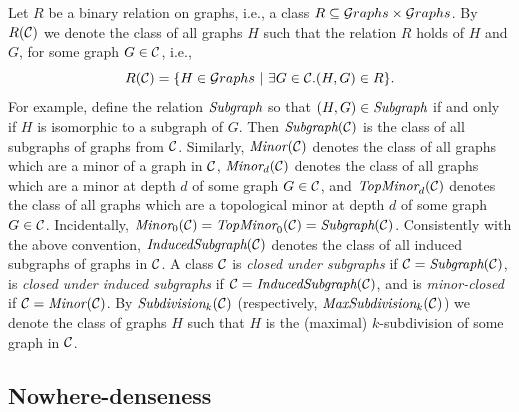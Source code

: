 Let $R$ be a binary relation on graphs, i.e., a class $R\subseteq {\mathcal G}\!\,raphs\times {\mathcal G}\!\,raphs$.
By $R({\cal C})$ we denote the class of all graphs $H$
such that the relation $R$ holds of $H$ and $G$, for some graph $G\in {\cal C}$, i.e.,
$$R({\cal C})=\{H\in {\mathcal G}\!\,raphs\ |\ \exists G\in {\cal C}. (H,G)\in R\}.$$
For example, define the relation $\textit{Subgraph}$
so that $(H,G)\in\textit{Subgraph}$ if and only if $H$
is isomorphic to a subgraph of $G$. Then $\textit{Subgraph}({\cal C})$
is the class of all subgraphs of graphs from ${\cal C}$.
Similarly, $\textit{Minor}_{}({\cal C})$ denotes the class of all graphs which are a minor of a graph in ${\cal C}$,
$\textit{Minor}_{d} ({\cal C})$ denotes the class of all graphs which are a minor at depth $d$ of some graph $G\in{\cal C}$,
and $\textit{TopMinor}_{d} ({\cal C})$ denotes the class of all graphs which 
are a topological minor at depth $d$ of some graph $G\in 
{\cal C}$. Incidentally, $\textit{Minor}_{0} ({\cal C})=\textit{TopMinor}_{0} 
({\cal C})=\textit{Subgraph}({\cal C})$. Consistently with the above 
convention, $\textit{InducedSubgraph}({\cal C})$ denotes the class of all induced 
subgraphs of graphs in ${\cal C}$.
A class ${\cal C}$ is \emph{closed under subgraphs} if ${\cal C}=\textit{Subgraph}({\cal C})$, is \emph{closed under induced subgraphs} if ${\cal C}=\textit{InducedSubgraph}({\cal C})$, and is \emph{minor-closed}
if ${\cal C}=\textit{Minor}_{}({\cal C})$.
By  $\textit{Subdivision}_{k}({\cal C})$ (respectively, $\textit{MaxSubdivision}_{k}({\cal C})$) we denote the class of graphs $H$
such that $H$ is the (maximal) $k$-subdivision of some graph in ${\cal C}$.




\subsection{Nowhere-denseness}
%

